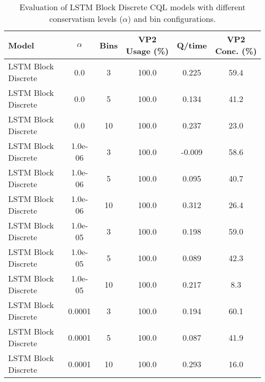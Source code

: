 \begin{table}[ht]
\centering
\caption{Evaluation of LSTM Block Discrete CQL models with different conservatism levels ($\alpha$) and bin configurations.}
\label{tab:lstm_cql_evaluation}
\begin{tabular}{lccccc}
\toprule
Model & $\alpha$ & Bins & VP2 Usage (\%) & Q/time & VP2 Conc. (\%) \\
\midrule
LSTM Block Discrete & 0.0 & 3 & 100.0 & 0.225 & 59.4 \\
LSTM Block Discrete & 0.0 & 5 & 100.0 & 0.134 & 41.2 \\
LSTM Block Discrete & 0.0 & 10 & 100.0 & 0.237 & 23.0 \\
LSTM Block Discrete & 1.0e-06 & 3 & 100.0 & -0.009 & 58.6 \\
LSTM Block Discrete & 1.0e-06 & 5 & 100.0 & 0.095 & 40.7 \\
LSTM Block Discrete & 1.0e-06 & 10 & 100.0 & 0.312 & 26.4 \\
LSTM Block Discrete & 1.0e-05 & 3 & 100.0 & 0.198 & 59.0 \\
LSTM Block Discrete & 1.0e-05 & 5 & 100.0 & 0.089 & 42.3 \\
LSTM Block Discrete & 1.0e-05 & 10 & 100.0 & 0.217 & 8.3 \\
LSTM Block Discrete & 0.0001 & 3 & 100.0 & 0.194 & 60.1 \\
LSTM Block Discrete & 0.0001 & 5 & 100.0 & 0.087 & 41.9 \\
LSTM Block Discrete & 0.0001 & 10 & 100.0 & 0.293 & 16.0 \\
\bottomrule
\end{tabular}
\end{table}